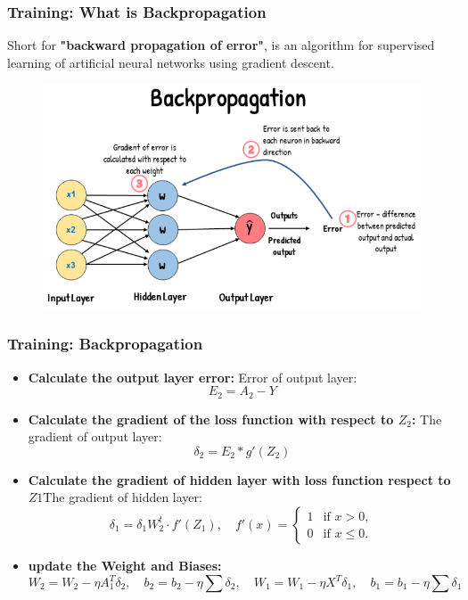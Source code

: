 \documentclass[aspectratio=1610]{beamer}
\begin{document}
\begin{frame}
    \frametitle{Training: What is Backpropagation}
    Short for \textbf{"backward propagation of error"}, is an algorithm for supervised learning of artificial neural networks using gradient descent.
    \begin{figure}
        \begin{center}
            \includegraphics[width=0.85\linewidth]{WhatIsBackpropagation.png}
        \end{center}
    \end{figure}


\end{frame}

\begin{frame}
    \frametitle{Training: Backpropagation}
    \begin{itemize}
        \item \textbf{Calculate the output layer error: }Error of output layer:
        \[E_2 = A_2-Y\]
        \item \textbf{Calculate the gradient of the loss function with respect to $Z_2$: }The gradient of output layer:
        \[\delta_2 = E_2*g'(Z_2)\]
        \item \textbf{Calculate the gradient of hidden layer with loss function respect to $Z1$}The gradient of hidden layer:
        \[
            \delta_1 = \delta_1 W_2^t \cdot f'(Z_1), \quad f'(x) = 
            \begin{cases}
            1 & \text{if } x > 0, \\
            0 & \text{if } x \leq 0.
            \end{cases}
        \]

        \item \textbf{update the Weight and Biases: }
        \[W_2 = W_2 - \eta A_1^T \delta_2 ,\quad b_2 = b_2 - \eta \sum \delta_2,\quad W_1= W_1 - \eta X^T \delta_1,\quad b_1 = b_1 - \eta\sum \delta_1\]
    \end{itemize}

    
\end{frame}
\end{document}
